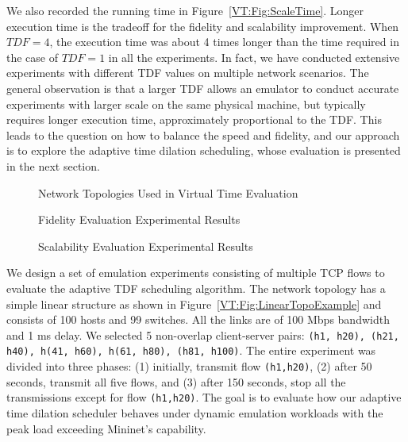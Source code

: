 We also recorded the running time in Figure~\ref{VT:Fig:ScaleTime}.
Longer execution time is the tradeoff for the fidelity and scalability improvement.
When $TDF=4$, the execution time was about 4 times longer than the time required in the case of $TDF=1$ in all the experiments.
In fact, we have conducted extensive experiments with different TDF values on multiple network scenarios.
The general observation is that a larger TDF allows an emulator to conduct accurate experiments with larger scale on the same physical machine,
but typically requires longer execution time, approximately proportional to the TDF.
This leads to the question on how to balance the speed and fidelity,
and our approach is to explore the adaptive time dilation scheduling, whose evaluation is presented in the next section. 

\begin{figure}
    \centering
    \caption{Network Topologies Used in Virtual Time Evaluation}
\end{figure}

\begin{figure}[t]
    \centering
    \caption{Fidelity Evaluation Experimental Results}
\end{figure}

\begin{figure}[t]
    \centering
    \caption{Scalability Evaluation Experimental Results}
\end{figure}

We design a set of emulation experiments consisting of multiple TCP flows to evaluate the adaptive TDF scheduling algorithm.
The network topology has a simple linear structure as shown in Figure~\ref{VT:Fig:LinearTopoExample} and consists of 100 hosts and 99 switches.
All the links are of 100 Mbps bandwidth and 1 ms delay.
We selected 5 non-overlap client-server pairs: \texttt{(h1, h20), (h21, h40), h(41, h60), h(61, h80), (h81, h100)}.
The entire experiment was divided into three phases: (1) initially, transmit flow \texttt{(h1,h20)},
(2) after 50 seconds, transmit all five flows, and (3) after 150 seconds, stop all the transmissions except for flow \texttt{(h1,h20)}.
The goal is to evaluate how our adaptive time dilation scheduler behaves under dynamic emulation workloads with the peak load exceeding Mininet's capability.

